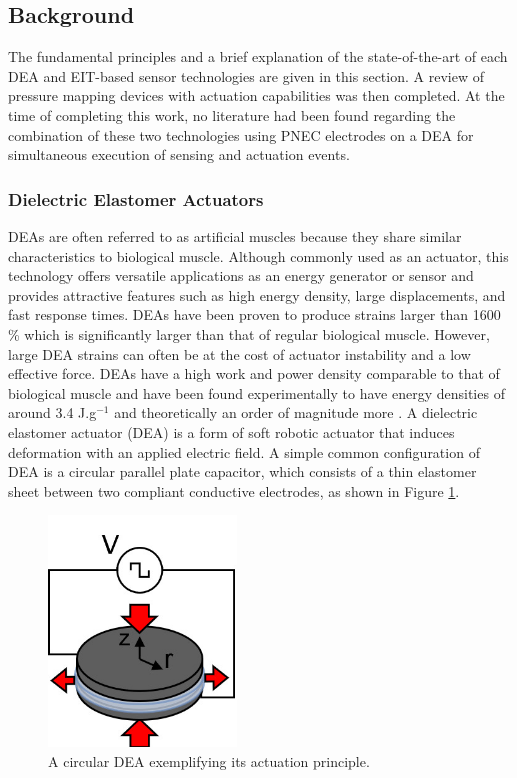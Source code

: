 \subsection{Background} 
\label{subsec:background}
The fundamental principles and a brief explanation of the state-of-the-art of each DEA and EIT-based sensor technologies are given in this section. A review of pressure mapping devices with actuation capabilities was then completed. At the time of completing this work, no literature had been found regarding the combination of these two technologies using PNEC electrodes on a DEA for simultaneous execution of sensing and actuation events.  

\subsubsection{Dielectric Elastomer Actuators}
\label{subsubsec:deas}
DEAs are often referred to as artificial muscles because they share similar characteristics to biological muscle. Although commonly used as an actuator, this technology offers versatile applications as an energy generator \cite{McKnight2002, Carpi2008, Koh2009} or sensor and provides attractive features such as high energy density, large displacements, and fast response times. DEAs have been proven to produce strains larger than 1600 \% \cite{Keplinger2012} which is significantly larger than that of regular biological muscle. However, large DEA strains can often be at the cost of actuator instability and a low effective force. DEAs have a high work and power density comparable to that of biological muscle and have been found experimentally to have energy densities of around 3.4 J.g$^{-1}$ and theoretically an order of magnitude more \cite{Liu2009, Koh2009}. A dielectric elastomer actuator (DEA) is a form of soft robotic actuator that induces deformation with an applied electric field. A simple common configuration of DEA is a circular parallel plate capacitor, which consists of a thin elastomer sheet between two compliant conductive electrodes, as shown in Figure \ref{fig:DEA_diagram}. 
\begin{figure}[H]
	\centering
	\includegraphics[width=5cm]{Figures/circ_DEA_v2.jpg} %
	\vspace{0.2cm}
	\caption{A circular DEA exemplifying its actuation principle.}
	\label{fig:DEA_diagram}
\end{figure}
